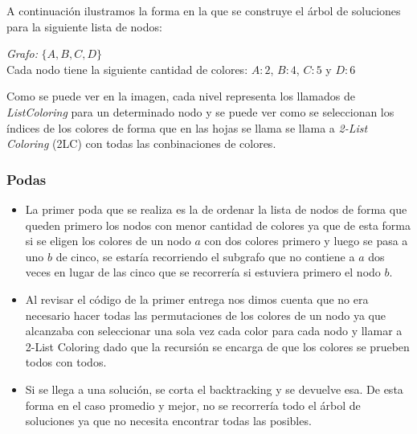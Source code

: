 A continuación ilustramos la forma en la que se construye el árbol de soluciones para la siguiente lista de nodos:

\begin{center}
\emph{Grafo:} $\{ A, B, C, D \}$\\
Cada nodo tiene la siguiente cantidad de colores: $A: 2$, $B:4$, $C:5$ y $D:6$
\end{center}

\begin{center}
\end{center}

Como se puede ver en la imagen, cada nivel representa los llamados de \emph{ListColoring} para un determinado nodo y se puede ver como se seleccionan los índices de los colores de forma que en las hojas se llama se llama a \emph{2-List Coloring} (2LC) con todas las conbinaciones de colores.

\subsubsection{Podas}

\begin{itemize}
	\item La primer poda que se realiza es la de ordenar la lista de nodos de forma que queden primero los nodos con menor cantidad de colores ya que de esta forma si se eligen los colores de un nodo $a$ con dos colores primero y luego se pasa a uno $b$ de cinco, se estaría recorriendo el subgrafo que no contiene a $a$ dos veces en lugar de las cinco que se recorrería si estuviera primero el nodo $b$.
	
	\item Al revisar el código de la primer entrega nos dimos cuenta que no era necesario hacer todas las permutaciones de los colores de un nodo ya que alcanzaba con seleccionar una sola vez cada color para cada nodo y llamar a 2-List Coloring dado que la recursión se encarga de que los colores se prueben todos con todos.
	\item Si se llega a una solución, se corta el backtracking y se devuelve esa. De esta forma en el caso promedio y mejor, no se recorrería todo el árbol de soluciones ya que no necesita encontrar todas las posibles.
\end{itemize}

